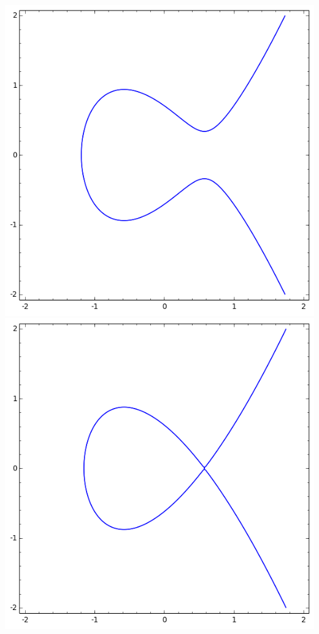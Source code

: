 \documentclass[class=report,crop=false]{standalone}
\begin{document}
\begin{center}
\includegraphics[scale=0.3]{figures/elliptic1}\quad
\includegraphics[scale=0.3]{figures/elliptic2}\quad

\end{center}
\end{document}
